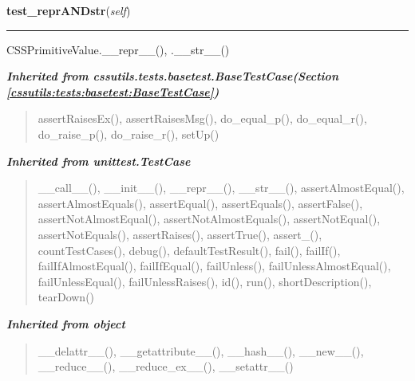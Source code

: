     \label{cssutils:tests:test_cssvalue:CSSPrimitiveValueTestCase:test_reprANDstr}

    \vspace{0.5ex}

\hspace{.8\funcindent}\begin{boxedminipage}{\funcwidth}

    \raggedright \textbf{test\_reprANDstr}(\textit{self})

    \vspace{-1.5ex}

    \rule{\textwidth}{0.5\fboxrule}
\setlength{\parskip}{2ex}
    CSSPrimitiveValue.\_\_repr\_\_(), .\_\_str\_\_()

\setlength{\parskip}{1ex}
    \end{boxedminipage}


\large{\textbf{\textit{Inherited from cssutils.tests.basetest.BaseTestCase\textit{(Section \ref{cssutils:tests:basetest:BaseTestCase})}}}}

\begin{quote}
assertRaisesEx(), assertRaisesMsg(), do\_equal\_p(), do\_equal\_r(), do\_raise\_p(), do\_raise\_r(), setUp()
\end{quote}

\large{\textbf{\textit{Inherited from unittest.TestCase}}}

\begin{quote}
\_\_call\_\_(), \_\_init\_\_(), \_\_repr\_\_(), \_\_str\_\_(), assertAlmostEqual(), assertAlmostEquals(), assertEqual(), assertEquals(), assertFalse(), assertNotAlmostEqual(), assertNotAlmostEquals(), assertNotEqual(), assertNotEquals(), assertRaises(), assertTrue(), assert\_(), countTestCases(), debug(), defaultTestResult(), fail(), failIf(), failIfAlmostEqual(), failIfEqual(), failUnless(), failUnlessAlmostEqual(), failUnlessEqual(), failUnlessRaises(), id(), run(), shortDescription(), tearDown()
\end{quote}

\large{\textbf{\textit{Inherited from object}}}

\begin{quote}
\_\_delattr\_\_(), \_\_getattribute\_\_(), \_\_hash\_\_(), \_\_new\_\_(), \_\_reduce\_\_(), \_\_reduce\_ex\_\_(), \_\_setattr\_\_()
\end{quote}

